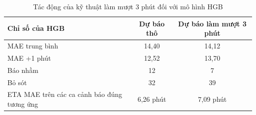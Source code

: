 \begin{table}[htbp]
        \centering
        \caption{Tác động của kỹ thuật làm mượt 3 phút đối với mô hình HGB}
        \begin{tabular}{|l|c|c|}
            \hline
            \textbf{Chỉ số của HGB} & \textbf{Dự báo thô} & \textbf{Dự báo làm mượt 3 phút} \\
            \hline
            MAE trung bình & 14,40 & 14,12 \\
            MAE +1 phút & 12,52 & 13,70 \\
            Báo nhầm & 12 & 7 \\
            Bỏ sót & 32 & 39 \\
            ETA MAE trên các ca cảnh báo đúng tương ứng & 6,26 phút & 7,09 phút \\
            \hline
        \end{tabular}
    \end{table}